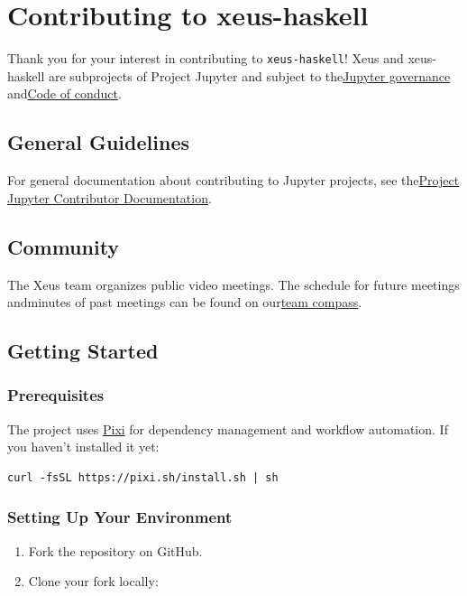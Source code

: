 \section{Contributing to xeus-haskell}


Thank you for your interest in contributing to \texttt{xeus-haskell}!
Xeus and xeus-haskell are subprojects of Project Jupyter and subject to the\href{https://github.com/jupyter/governance}{Jupyter governance} and\href{https://github.com/jupyter/governance/blob/master/conduct/code\_of\_conduct.md}{Code of conduct}.
\subsection{General Guidelines}


For general documentation about contributing to Jupyter projects, see the\href{https://jupyter.readthedocs.io/en/latest/contributor/content-contributor.html}{Project Jupyter Contributor Documentation}.
\subsection{Community}


The Xeus team organizes public video meetings. The schedule for future meetings andminutes of past meetings can be found on our\href{https://jupyter-xeus.github.io/}{team compass}.
\subsection{Getting Started}


\subsubsection{Prerequisites}


The project uses \href{https://pixi.sh/}{Pixi} for dependency management and workflow automation. If you haven't installed it yet:
\begin{verbatim}
curl -fsSL https://pixi.sh/install.sh | sh
\end{verbatim}


\subsubsection{Setting Up Your Environment}


\begin{enumerate}
\item Fork the repository on GitHub.
\item Clone your fork locally:
\end{enumerate}


